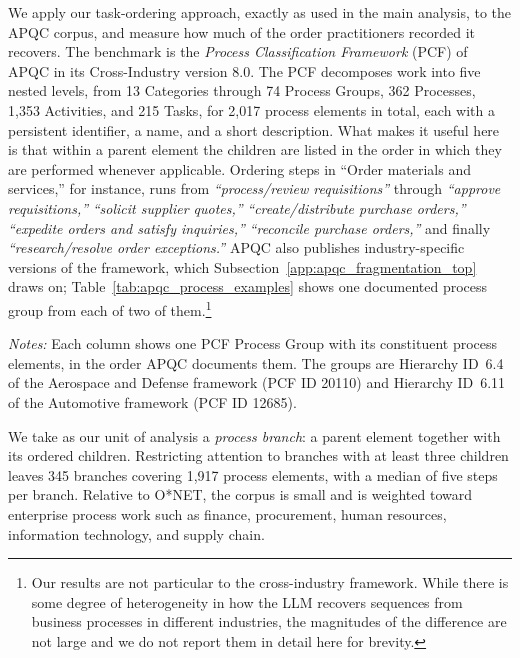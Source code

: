 We apply our task-ordering approach, exactly as used in the main analysis, to the APQC corpus, and measure how much of the
order practitioners recorded it recovers.
The benchmark is the \emph{Process Classification Framework} (PCF) of APQC in its Cross-Industry version 8.0.
The PCF decomposes work into five nested levels, from 13 Categories through 74 Process Groups, 362 Processes, 1,353 Activities, and 215 Tasks, for 2,017 process elements in total, each with a persistent identifier, a name, and a short description.
What makes it useful here is that within a parent element the children are listed in the order in which they are performed whenever applicable. Ordering steps in ``Order materials and services,'' for instance, runs from \textit{``process/review requisitions''} through \textit{``approve requisitions,''} \textit{``solicit supplier quotes,''} \textit{``create/distribute purchase orders,''} \textit{``expedite orders and satisfy inquiries,''} \textit{``reconcile purchase orders,''} and finally \textit{``research/resolve order exceptions.''}
APQC also publishes industry-specific versions of the framework, which Subsection~\ref{app:apqc_fragmentation_top} draws on; Table~\ref{tab:apqc_process_examples} shows one documented process group from each of two of them.\footnote{Our results are not particular to the cross-industry framework. While there is some degree of heterogeneity in how the LLM recovers sequences from business processes in different industries, the magnitudes of the difference are not large and we do not report them in detail here for brevity.}
\begin{table}[h!]
    \caption{Example Process Groups From Two Industry Frameworks}
    \label{tab:apqc_process_examples}
    \begin{center}
    
    \end{center}
    \raggedright \footnotesize{\emph{Notes:}} Each column shows one PCF Process Group with its constituent process elements, in the order APQC documents them. The groups are Hierarchy ID~6.4 of the Aerospace and Defense framework (PCF ID 20110) and Hierarchy ID~6.11 of the Automotive framework (PCF ID 12685).
\end{table}

We take as our unit of analysis a \emph{process branch}: a parent element together with its ordered children.
Restricting attention to branches with at least three children leaves 345 branches covering 1,917 process elements, with a median of five steps per branch.
Relative to O*NET, the corpus is small and is weighted toward enterprise process work such as finance, procurement, human resources, information technology, and supply chain.

